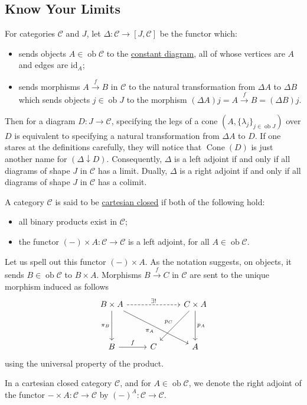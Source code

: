 \documentclass[a4paper,11pt]{article}
\theoremstyle{break_italics}
\theoremstyle{break_upright}
\theoremstyle{remark}
\newcommand{\id}{\mathrm{id}}
\newcommand{\ob}{\operatorname{ob}}
\newcommand{\C}{\mathcal{C}}
\begin{document}
\subsection{Know Your Limits}

For categories $\C$ and $J$, let $\Delta \colon \C \to [J,\C]$ be the functor which:
\begin{itemize}
	\item sends objects $A \in \ob\C$ to the \uline{constant diagram}, all of whose vertices are $A$ and edges are $\id_A$;
	\item sends morphisms $A \xrightarrow{f} B$ in $\C$ to the natural transformation from $\Delta A$ to $\Delta B$ which sends objects $j \in \ob J$ to the morphism $(\Delta A)j = A \xrightarrow{f} B = (\Delta B)j$.
\end{itemize}
Then for a diagram $D \colon J \to \C$, specifying the legs of a cone $(A, \{\lambda_j\}_{j \in \ob J})$ over $D$ is equivalent to specifying a natural transformation from $\Delta A$ to $D$. If one stares at the definitions carefully, they will notice that $\operatorname{Cone}(D)$ is just another name for $(\Delta \downarrow D)$. Consequently, $\Delta$ is a left adjoint if and only if all diagrams of shape $J$ in $\C$ has a limit. Dually, $\Delta$ is a right adjoint if and only if all diagrams of shape $J$ in $\C$ has a colimit.

A category $\C$ is said to be \uline{cartesian closed} if both of the following hold:
\begin{itemize}
	\item all binary products exist in $\C$;
	\item the functor $(-) \times A \colon \C \to \C$ is a left adjoint, for all $A \in \ob\C$.
\end{itemize}
Let us spell out this functor $(-) \times A$. As the notation suggests, on objects, it sends $B \in\ob\C$ to $B \times A$. Morphisms $B \xrightarrow{f} C$ in $\C$ are sent to the unique morphism induced as follows
\[\begin{tikzcd}
	{B \times A} && {C \times A} \\
	\\
	B & C & A
	\arrow["{\exists!}", dashed, from=1-1, to=1-3]
	\arrow["{\pi_B}"', from=1-1, to=3-1]
	\arrow["{\pi_A}"', from=1-1, to=3-3]
	\arrow["{p_C}"', from=1-3, to=3-2]
	\arrow["{p_A}", from=1-3, to=3-3]
	\arrow["f", from=3-1, to=3-2]
\end{tikzcd}\]
using the universal property of the product.

In a cartesian closed category $\C$, and for $A \in\ob\C$, we denote the right adjoint of the functor $- \times A \colon \C \to \C$ by $(-)^A \colon \C \to \C$. 
\end{document}
